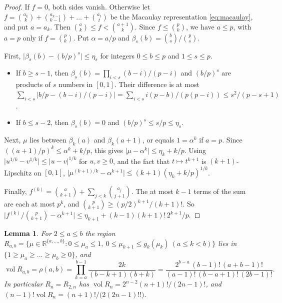 \documentclass[11pt, a4paper, abstract=yes]{scrartcl}
\theoremstyle{definition}
\theoremstyle{remark}
\theoremstyle{plain}
\newtheorem{lemma}[definition]{Lemma}
\theoremstyle{remark}
\theoremstyle{plain}
\newcommand{\vol}{\operatorname{vol}}
\newcommand{\leanpartial}{\tikz[baseline=-0.6ex]{\fill[leanfull] (0,-0.6ex) arc (-90:90:0.6ex) -- cycle;\draw[leanfull,line width=0.5pt] (0,0) circle (0.6ex);}}
\newcommand{\leanmark}[1]{\leavevmode{\reversemarginpar\marginnote{\raggedleft#1}}}
\begin{document}
\begin{proof}
If \(f=0\), both sides vanish. Otherwise let
\(f=\binom{a_k}k+\binom{a_{k-1}}{k-1}+\dots+\binom{a_t}t\) be the Macaulay representation
\eqref{eq:macaulay}, and put \(a=a_k\). Then \(\binom ak\le f<\binom{a+1}k\). Since \(f\le\binom pk\),
we have \(a\le p\), with \(a=p\) only if \(f=\binom pk\). Put \(\alpha=a/p\) and
\(\beta_s(b)=\binom bs/\binom ps\).

First, \(\lvert\beta_s(b)-(b/p)^s\rvert\le\eta_s\) for integers \(0\le b\le p\) and \(1\le s\le p\).
\begin{itemize}
\item If \(b\ge s-1\), then \(\beta_s(b)=\prod_{i<s}(b-i)/(p-i)\) and \((b/p)^s\) are products of \(s\)
numbers in \([0,1]\). Their difference is at most
\(\sum_{i<s}\lvert b/p-(b-i)/(p-i)\rvert=\sum_{i<s}i(p-b)/(p(p-i))\le s^2/(p-s+1)\).
\item If \(b\le s-2\), then \(\beta_s(b)=0\) and \((b/p)^s\le s/p\le\eta_s\).
\end{itemize}

Next, \(\mu\) lies between \(\beta_k(a)\) and \(\beta_k(a+1)\), or equals \(1=\alpha^k\) if \(a=p\).
Since \(((a+1)/p)^k\le\alpha^k+k/p\), this gives \(\lvert\mu-\alpha^k\rvert\le\eta_k+k/p\). Using
\(\lvert u^{1/k}-v^{1/k}\rvert\le\lvert u-v\rvert^{1/k}\) for \(u,v\ge0\), and the fact that
\(t\mapsto t^{k+1}\) is \((k+1)\)-Lipschitz on \([0,1]\),
\(\lvert\mu^{(k+1)/k}-\alpha^{k+1}\rvert\le(k+1)(\eta_k+k/p)^{1/k}\).

Finally, \(f^{(k)}=\binom a{k+1}+\sum_{j<k}\binom{a_j}{j+1}\). The at most \(k-1\) terms of the sum
are each at most \(p^k\), and \(\binom p{k+1}\ge(p/2)^{k+1}/(k+1)!\). So
\(\bigl\lvert f^{(k)}/\binom p{k+1}-\alpha^{k+1}\bigr\rvert
\le\eta_{k+1}+(k-1)(k+1)!\,2^{k+1}/p\).
\end{proof}

\begin{lemma}
\leanmark{\leanpartial}For \(2\le a\le b\) the region
\(R_{a,b}=\lbrace\mu\in\mathbb R^{\lbrace a,\dots,b\rbrace}:0\le\mu_a\le1,\ 0\le\mu_{k+1}\le g_k(\mu_k)
\ (a\le k<b)\rbrace\) lies in \(\lbrace1\ge\mu_a\ge\dots\ge\mu_b\ge0\rbrace\), and
\[
  \vol R_{a,b}=\rho(a,b)=\prod_{k=a}^{b-1}\frac{2k}{(b-k+1)(b+k)}
  =\frac{2^{b-a}\,(b-1)!\,(a+b-1)!}{(a-1)!\,(b-a+1)!\,(2b-1)!} .
\]
In particular \(R_n=R_{2,n}\) has \(\vol R_n=2^{n-2}(n+1)!/(2n-1)!\), and
\((n-1)!\vol R_n=(n+1)!/\bigl(2(2n-1)!!\bigr)\).
\label{lem-rho}
\end{lemma}
\end{document}

